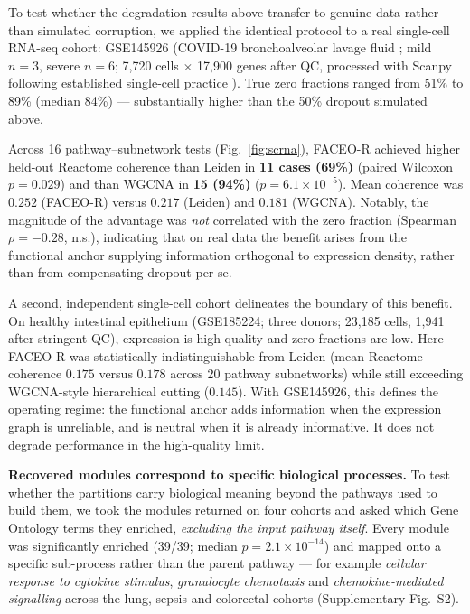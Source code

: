 \documentclass[twocolumn,10pt,letterpaper]{article}
\begin{document}
To test whether the degradation results above transfer to genuine data rather than simulated
corruption, we applied the identical protocol to a real single-cell RNA-seq cohort: GSE145926
(COVID-19 bronchoalveolar lavage fluid \citep{liao2020covid}; mild $n=3$, severe $n=6$;
7{,}720 cells $\times$ 17{,}900 genes after QC, processed with Scanpy \citep{wolf2018scanpy} following established
single-cell practice \citep{luecken2019benchmark}). True zero fractions ranged
from 51\% to 89\% (median 84\%) ---
substantially higher than the 50\% dropout simulated above.

Across 16 pathway--subnetwork tests (Fig.~\ref{fig:scrna}), FACEO-R achieved higher
held-out Reactome coherence
than Leiden in \textbf{11 cases (69\%)} (paired Wilcoxon $p = 0.029$) and than WGCNA in
\textbf{15 (94\%)} ($p = 6.1\times10^{-5}$). Mean coherence was $0.252$ (FACEO-R) versus
$0.217$ (Leiden) and $0.181$ (WGCNA). Notably, the magnitude of the advantage was \emph{not}
correlated with the zero fraction (Spearman $\rho = -0.28$, n.s.), indicating that on real
data the benefit arises from the functional anchor supplying information orthogonal to
expression density, rather than from compensating dropout per se.

A second, independent single-cell cohort delineates the boundary of this benefit.
On healthy intestinal epithelium (GSE185224; three donors; 23{,}185 cells, 1{,}941 after
stringent QC), expression is high quality and zero fractions are low. Here FACEO-R was
statistically indistinguishable from Leiden
(mean Reactome coherence $0.175$ versus $0.178$ across 20 pathway subnetworks) while still
exceeding WGCNA-style hierarchical cutting ($0.145$). With GSE145926, this defines the
operating regime: the functional anchor adds information when the expression graph is
unreliable, and is neutral when it is already informative. It does not degrade performance
in the high-quality limit.

\noindent\textbf{Recovered modules correspond to specific biological processes.} To test
whether the partitions carry biological meaning beyond the pathways used to build them, we
took the modules returned on four cohorts and asked which Gene Ontology terms they enriched,
\emph{excluding the input pathway itself}. Every module was significantly enriched
(39/39; median $p = 2.1\times10^{-14}$) and mapped onto a specific sub-process rather than
the parent pathway --- for example \emph{cellular response to cytokine stimulus},
\emph{granulocyte chemotaxis} and \emph{chemokine-mediated signalling} across the lung,
sepsis and colorectal cohorts (Supplementary Fig.~S2).
\end{document}
